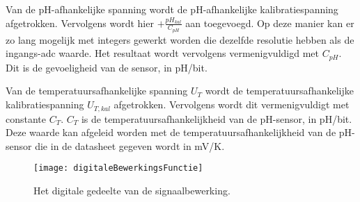 Van de pH-afhankelijke spanning wordt de pH-afhankelijke kalibratiespanning afgetrokken. Vervolgens wordt hier $+\frac{pH_{kal}}{C_{pH}}$ aan toegevoegd. Op deze manier kan er zo lang mogelijk met integers gewerkt worden die dezelfde resolutie hebben als de ingangs-adc waarde. Het resultaat wordt vervolgens vermenigvuldigd met $C_{pH}$. Dit is de gevoeligheid van de sensor, in pH/bit.

Van de temperatuursafhankelijke spanning $U_T$ wordt de temperatuursafhankelijke kalibratiespanning $U_{T,kal}$ afgetrokken. Vervolgens wordt dit vermenigvuldigt met constante $C_T$. $C_T$ is de temperatuursafhankelijkheid van de pH-sensor, in pH/bit. Deze waarde kan afgeleid worden met de temperatuursafhankelijkheid van de pH-sensor die in de datasheet gegeven wordt in mV/K.

\begin{figure}[ht]
    \centering
    \texttt{[image: digitaleBewerkingsFunctie]}
    \caption{Het digitale gedeelte van de signaalbewerking.} 
    \label{fig:digitaleBewerkingsFunctie}
\end{figure}

















%
